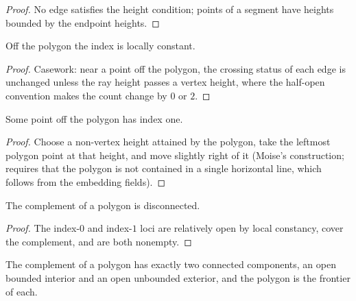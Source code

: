 \begin{proof}
\leanok
No edge satisfies the height condition; points of a segment have heights
bounded by the endpoint heights.
\end{proof}

\begin{lemma}
\label{moise:lem:index_locally_constant}
\leanok
{}
Off the polygon the index is locally constant.
\end{lemma}

\begin{proof}
\leanok
Casework: near a point off the polygon, the crossing status of each edge is
unchanged unless the ray height passes a vertex height, where the half-open
convention makes the count change by $0$ or $2$.
\end{proof}

\begin{lemma}
\label{moise:lem:index_one_exists}
\leanok
{}
Some point off the polygon has index one.
\end{lemma}

\begin{proof}
\leanok
Choose a non-vertex height attained by the polygon, take the leftmost polygon
point at that height, and move slightly right of it (Moise's construction;
requires that the polygon is not contained in a single horizontal line, which
follows from the embedding fields).
\end{proof}

\begin{lemma}
\label{moise:lem:complement_disconnected}
\leanok
{}
The complement of a polygon is disconnected.
\end{lemma}

\begin{proof}
\leanok
The index-$0$ and index-$1$ loci are relatively open by local constancy, cover
the complement, and are both nonempty.
\end{proof}

\begin{theorem}
\label{moise:thm:polygonal_jordan}
\leanok
{}
The complement of a polygon has exactly two connected components, an open
bounded interior and an open unbounded exterior, and the polygon is the
frontier of each.
\end{theorem}

